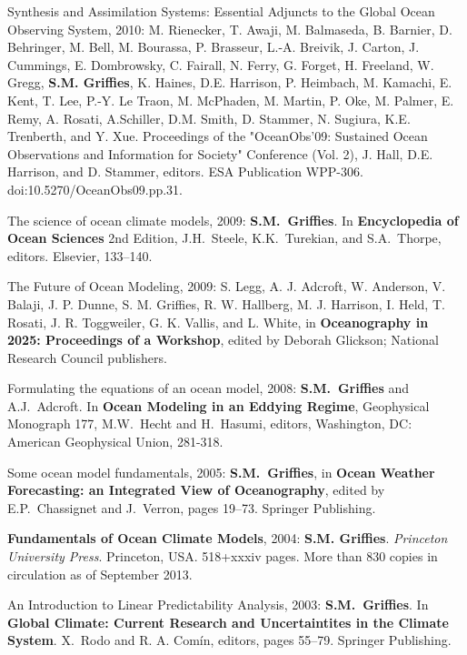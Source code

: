 \begin{etaremune}
\item Synthesis and Assimilation Systems: Essential Adjuncts to the
  Global Ocean Observing System, 2010: M. Rienecker, T. Awaji,
  M. Balmaseda, B. Barnier, D. Behringer, M. Bell, M. Bourassa,
  P. Brasseur, L.-A. Breivik, J. Carton, J. Cummings, E. Dombrowsky,
  C. Fairall, N. Ferry, G. Forget, H. Freeland, W. Gregg, {\bf
    S.M. Grif\/f\/ies}, K. Haines, D.E. Harrison, P. Heimbach,
  M. Kamachi, E. Kent, T. Lee, P.-Y. {Le Traon}, M. McPhaden,
  M. Martin, P. Oke, M. Palmer, E. Remy, A. Rosati, A.Schiller,
  D.M. Smith, D. Stammer, N. Sugiura, K.E. Trenberth, and Y. Xue.
  Proceedings of the "OceanObs’09: Sustained Ocean Observations and
  Information for Society" Conference (Vol. 2), J. Hall,
  D.E. Harrison, and D. Stammer, editors. ESA Publication WPP-306.
  doi:10.5270/OceanObs09.pp.31.

\item The science of ocean climate models, 2009: {\bf S.M.\
    Grif\/f\/ies}.  In {\bf Encyclopedia of Ocean Sciences} 2nd
  Edition,  J.H.\ Steele, K.K.\ Turekian, and S.A.\ Thorpe, editors.
  Elsevier, 133--140.

\item The Future of Ocean Modeling, 2009: S. Legg, A. J. Adcroft, W.
  Anderson, V. Balaji, J. P. Dunne, S. M. Grif\/f\/ies,
  R. W. Hallberg, M. J. Harrison, I. Held, T. Rosati,
  J. R. Toggweiler, G. K. Vallis, and L.  White, in {\bf Oceanography
  in 2025: Proceedings of a Workshop}, edited by Deborah Glickson;
  National Research Council publishers.  

\item Formulating the equations of an ocean model, 2008: {\bf S.M.\
    Grif\/f\/ies} and A.J.\ Adcroft. In {\bf Ocean Modeling in an
    Eddying Regime}, Geophysical Monograph 177, M.W.\ Hecht and H.\
  Hasumi, editors, Washington, DC: American Geophysical Union,
  281-318.

\item Some ocean model fundamentals, 2005: {\bf S.M.\ Grif\/f\/ies}, in {\bf
Ocean Weather Forecasting: an Integrated View of Oceanography}, edited
by E.P.\ Chassignet and J.\ Verron, pages 19--73.  Springer
Publishing.

\item {\bf Fundamentals of Ocean Climate Models}, 2004: {\bf
    S.M. Grif\/f\/ies}. {\em Princeton University Press}. Princeton,
  USA.  518+xxxiv pages.  More than 830 copies in circulation as of
  September 2013.

\item An Introduction to Linear Predictability Analysis, 2003: {\bf
    S.M.\ Grif\/f\/ies}.  In {\bf Global Climate: Current Research and
    Uncertaintites in the Climate System}. X.\ Rodo and R. A. Com\'in,
  editors, pages 55--79.  Springer Publishing.


\end{etaremune}
